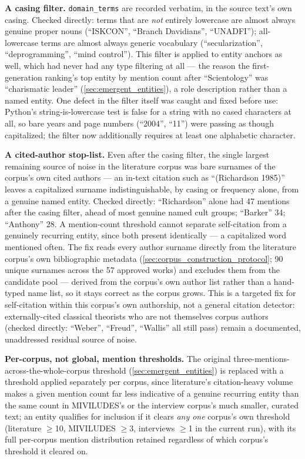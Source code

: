 \textbf{A casing filter.} \texttt{domain\_terms} are recorded verbatim, in the source text's own casing. Checked directly: terms that are \emph{not} entirely lowercase are almost always genuine proper nouns (\enquote{ISKCON}, \enquote{Branch Davidians}, \enquote{UNADFI}); all-lowercase terms are almost always generic vocabulary (\enquote{secularization}, \enquote{deprogramming}, \enquote{mind control}). This filter is applied to entity anchors as well, which had never had any type filtering at all — the reason the first-generation ranking's top entity by mention count after \enquote{Scientology} was \enquote{charismatic leader} (\ref{sec:emergent_entities}), a role description rather than a named entity. One defect in the filter itself was caught and fixed before use: Python's string-is-lowercase test is false for a string with no cased characters at all, so bare years and page numbers (\enquote{2004}, \enquote{11}) were passing as though capitalized; the filter now additionally requires at least one alphabetic character.

\textbf{A cited-author stop-list.} Even after the casing filter, the single largest remaining source of noise in the literature corpus was bare surnames of the corpus's own cited authors — an in-text citation such as \enquote{(Richardson 1985)} leaves a capitalized surname indistinguishable, by casing or frequency alone, from a genuine named entity. Checked directly: \enquote{Richardson} alone had 47 mentions after the casing filter, ahead of most genuine named cult groups; \enquote{Barker} 34; \enquote{Anthony} 28. A mention-count threshold cannot separate self-citation from a genuinely recurring entity, since both present identically — a capitalized word mentioned often. The fix reads every author surname directly from the literature corpus's own bibliographic metadata (\ref{sec:corpus_construction_protocol}; 90 unique surnames across the 57 approved works) and excludes them from the candidate pool — derived from the corpus's own author list rather than a hand-typed name list, so it stays correct as the corpus grows. This is a targeted fix for self-citation within this corpus's own authorship, not a general citation detector: externally-cited classical theorists who are not themselves corpus authors (checked directly: \enquote{Weber}, \enquote{Freud}, \enquote{Wallis} all still pass) remain a documented, unaddressed residual source of noise.

\textbf{Per-corpus, not global, mention thresholds.} The original three-mentions-across-the-whole-corpus threshold (\ref{sec:emergent_entities}) is replaced with a threshold applied separately per corpus, since literature's citation-heavy volume makes a given mention count far less indicative of a genuine recurring entity than the same count in MIVILUDES's or the interview corpus's much smaller, curated text; an entity qualifies for inclusion if it clears \emph{any one} corpus's own threshold (literature $\geq$10, MIVILUDES $\geq$3, interviews $\geq$1 in the current run), with its full per-corpus mention distribution retained regardless of which corpus's threshold it cleared on.

